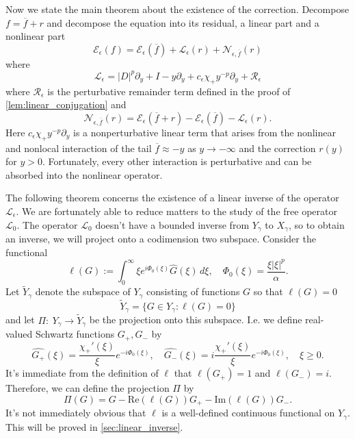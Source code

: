 \documentclass[11pt]{amsart}
\theoremstyle{definition}
\theoremstyle{remark}
\numberwithin{equation}{section}
\newcommand{\sq}[1]{\widetilde{#1}}
\newcommand{\mc}[1]{\mathcal{#1}}
\newcommand{\ov}[1]{\overline{#1}}
\begin{document}
Now we state the main theorem about the existence of the correction. Decompose $f = \overline{f} + r$ and decompose the equation into its residual, a linear part and a nonlinear part
\[\mc{E}_{\epsilon}(f) = \mc{E}_{\epsilon}(\ov{f}) + \mc{L}_{\epsilon}(r) + \mc{N}_{\epsilon, \ov{f}}(r)\]
where 
\[\mc{L}_{\epsilon} = |D|^{p}\partial_y + I - y\partial_y + c_\epsilon \chi_+y^{-p} \partial_y + \mc{R}_\epsilon\]
where $\mc{R}_\epsilon$ is the perturbative remainder term defined in the proof of \cref{lem:linear_conjugation} and 
\[\mc{N}_{\epsilon, \ov{f}}(r) = \mc{E}_{\epsilon}(\ov{f} + r) - \mc{E}_{\epsilon}(\ov{f}) - \mc{L}_{\epsilon}(r).\]
Here $c_\epsilon \chi_+ y^{-p} \partial_y$ is a nonperturbative linear term that arises from the nonlinear and nonlocal interaction of the tail $\ov{f} \approx -y$ as $y \to - \infty$ and the correction $r(y)$ for $y > 0$. Fortunately, every other interaction is perturbative and can be absorbed into the nonlinear operator.

The following theorem concerns the existence of a linear inverse of the operator $\mc{L}_\epsilon$. We are fortunately able to reduce matters to the study of the free operator $\mc{L}_0$. The operator $\mc{L}_0$ doesn't have a bounded inverse from $Y_\gamma$ to $X_\gamma$, so to obtain an inverse, we will project onto a codimension two subspace. Consider the functional 
\[\ell(G) := \int_{0}^{\infty}\xi e^{i \Phi_0(\xi)}\widehat{G}(\xi) \, d\xi, \quad \Phi_0(\xi) = \frac{\xi|\xi|^p}{\alpha}.\]
Let $\sq{Y}_\gamma$ denote the subspace of $Y_\gamma$ consisting of functions $G$ so that $\ell(G) = 0$
\[\sq{Y}_\gamma = \{G \in Y_\gamma : \ell(G) = 0\}\]
and let $\Pi:\ Y_\gamma \to \sq{Y}_\gamma$ be the projection onto this subspace. I.e. we define real-valued Schwartz functions $G_+, G_-$ by 
\[\widehat{G_+}(\xi) = \frac{\chi_+'(\xi)}{\xi}e^{-i\Phi_0(\xi)}, \quad \widehat{G_-}(\xi) = i\frac{\chi_+'(\xi)}{\xi}e^{-i\Phi_0(\xi)}, \quad \xi \geq 0.\]
It's immediate from the definition of $\ell$ that $\ell(G_+) = 1$ and $\ell(G_-) = i$. Therefore, we can define the projection $\Pi$ by
\[\Pi (G) = G - \text{Re}(\ell(G))G_+ - \text{Im}(\ell(G))G_-.\]
It's not immediately obvious that $\ell$ is a well-defined continuous functional on $Y_\gamma$. This will be proved in \cref{sec:linear_inverse}.
\end{document}
